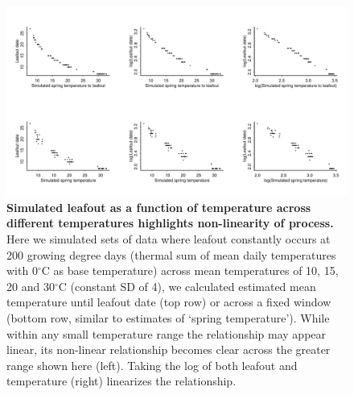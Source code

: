 \documentclass[11pt]{article}
\begin{document}
\begin{figure}[h!]
\centering
\noindent \includegraphics[width=1\textwidth]{..//analyses/figures/simslogging.pdf}
\caption{\textbf{Simulated leafout as a function of temperature across different temperatures highlights non-linearity of process.} Here we simulated sets of data where leafout constantly occurs at 200 growing degree days (thermal sum of mean daily temperatures with 0$^{\circ}$C as base temperature) across mean temperatures of 10, 15, 20 and 30$^{\circ}$C (constant SD of 4), we calculated estimated mean temperature until leafout date (top row) or across a fixed window (bottom row, similar to estimates of `spring temperature'). While within any small temperature range the relationship may appear linear, its non-linear relationship becomes clear across the greater range shown here (left). Taking the log of both leafout and temperature (right) linearizes the relationship.}
\label{fig:simslog} %
\end{figure}
\end{document}
